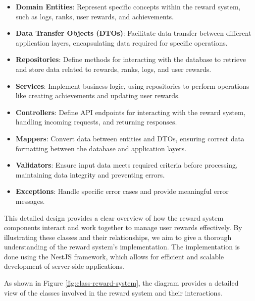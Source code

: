\begin{itemize}
    \item \textbf{Domain Entities}: Represent specific concepts within the reward system, such as logs, ranks, user rewards, and achievements.
    
    \item \textbf{Data Transfer Objects (DTOs)}: Facilitate data transfer between different application layers, encapsulating data required for specific operations.
    
    \item \textbf{Repositories}: Define methods for interacting with the database to retrieve and store data related to rewards, ranks, logs, and user rewards.
    
    \item \textbf{Services}: Implement business logic, using repositories to perform operations like creating achievements and updating user rewards.
    
    \item \textbf{Controllers}: Define API endpoints for interacting with the reward system, handling incoming requests, and returning responses.
    
    \item \textbf{Mappers}: Convert data between entities and DTOs, ensuring correct data formatting between the database and application layers.
    
    \item \textbf{Validators}: Ensure input data meets required criteria before processing, maintaining data integrity and preventing errors.
    
    \item \textbf{Exceptions}: Handle specific error cases and provide meaningful error messages.
\end{itemize}

This detailed design provides a clear overview of how the reward system components interact and work together to manage user rewards effectively. By illustrating these classes and their relationships, we aim to give a thorough understanding of the reward system's implementation. The implementation is done using the NestJS framework, which allows for efficient and scalable development of server-side applications.

As shown in Figure \ref{fig:class-reward-system}, the diagram provides a detailed view of the classes involved in the reward system and their interactions.

